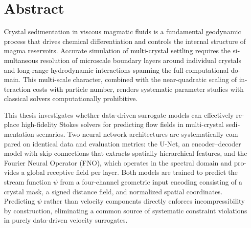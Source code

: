 
\chapter*{Abstract}

\begin{otherlanguage}{english}
Crystal sedimentation in viscous magmatic fluids is a fundamental geodynamic
process that drives chemical differentiation and controls the internal structure
of magma reservoirs. Accurate simulation of multi-crystal settling requires the
simultaneous resolution of microscale boundary layers around individual crystals
and long-range hydrodynamic interactions spanning the full computational domain.
This multi-scale character, combined with the near-quadratic scaling of
interaction costs with particle number, renders systematic parameter studies
with classical solvers computationally prohibitive.

This thesis investigates whether data-driven surrogate models can effectively
replace high-fidelity Stokes solvers for predicting flow fields in multi-crystal
sedimentation scenarios. Two neural network architectures are systematically
compared on identical data and evaluation metrics: the U-Net, an encoder--decoder
model with skip connections that extracts spatially hierarchical features, and
the Fourier Neural Operator (FNO), which operates in the spectral domain and
provides a global receptive field per layer. Both models are trained to predict
the stream function $\psi$ from a four-channel geometric input encoding consisting
of a crystal mask, a signed distance field, and normalized spatial coordinates. Predicting $\psi$ rather
than velocity components directly enforces incompressibility by construction,
eliminating a common source of systematic constraint violations in purely
data-driven velocity surrogates.


\end{otherlanguage}
